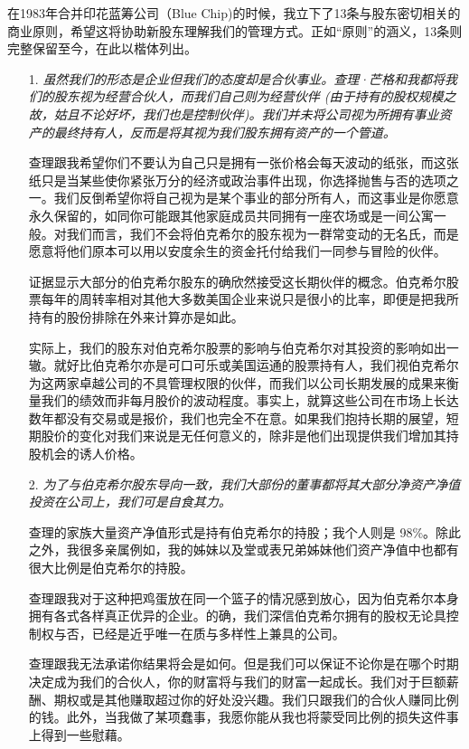\documentclass[UTF8,a4paper,zihao=-4,fontset = windows]{ctexart} %
\begin{document}
在1983年合并印花蓝筹公司（Blue Chip)的时候，我立下了13条与股东密切相关的商业原则，希望这将协助新股东理解我们的管理方式。正如“原则”的涵义，13条则完整保留至今，在此以楷体列出。
\begin{itemize}
    \item [1.]
    \textit{虽然我们的形态是企业但我们的态度却是合伙事业。查理·芒格和我都将我们的股东视为经营合伙人，而我们自己则为经营伙伴 (由于持有的股权规模之故，姑且不论好坏，我们也是控制伙伴)。我们并未将公司视为所拥有事业资产的最终持有人，反而是将其视为我们股东拥有资产的一个管道。}
    
    查理跟我希望你们不要认为自己只是拥有一张价格会每天波动的纸张，而这张纸只是当某些使你紧张万分的经济或政治事件出现，你选择抛售与否的选项之一。我们反倒希望你将自己视为是某个事业的部分所有人，而这事业是你愿意永久保留的，如同你可能跟其他家庭成员共同拥有一座农场或是一间公寓一般。对我们而言，我们不会将伯克希尔的股东视为一群常变动的无名氏，而是愿意将他们原本可以用以安度余生的资金托付给我们一同参与冒险的伙伴。
    
    证据显示大部分的伯克希尔股东的确欣然接受这长期伙伴的概念。伯克希尔股票每年的周转率相对其他大多数美国企业来说只是很小的比率，即便是把我所持有的股份排除在外来计算亦是如此。
    
    实际上，我们的股东对伯克希尔股票的影响与伯克希尔对其投资的影响如出一辙。就好比伯克希尔亦是可口可乐或美国运通的股票持有人，我们视伯克希尔为这两家卓越公司的不具管理权限的伙伴，而我们以公司长期发展的成果来衡量我们的绩效而非每月股价的波动程度。事实上，就算这些公司在市场上长达数年都没有交易或是报价，我们也完全不在意。如果我们抱持长期的展望，短期股价的变化对我们来说是无任何意义的，除非是他们出现提供我们增加其持股机会的诱人价格。

    \item [2.]
    \textit{为了与伯克希尔股东导向一致，我们大部份的董事都将其大部分净资产净值投资在公司上，我们可是自食其力。}

    查理的家族大量资产净值形式是持有伯克希尔的持股；我个人则是 98\%。除此之外，我很多亲属例如，我的姊妹以及堂或表兄弟姊妹他们资产净值中也都有很大比例是伯克希尔的持股。
    
    查理跟我对于这种把鸡蛋放在同一个篮子的情况感到放心，因为伯克希尔本身拥有各式各样真正优异的企业。的确，我们深信伯克希尔拥有的股权无论具控制权与否，已经是近乎唯一在质与多样性上兼具的公司。
    
    查理跟我无法承诺你结果将会是如何。但是我们可以保证不论你是在哪个时期决定成为我们的合伙人，你的财富将与我们的财富一起成长。我们对于巨额薪酬、期权或是其他赚取超过你的好处没兴趣。我们只跟我们的合伙人赚同比例的钱。此外，当我做了某项蠢事，我愿你能从我也将蒙受同比例的损失这件事上得到一些慰藉。


\end{itemize}
\end{document}
